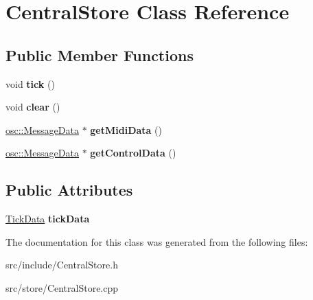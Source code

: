 \hypertarget{classCentralStore}{\section{Central\-Store Class Reference}
\label{classCentralStore}
}
\subsection*{Public Member Functions}
\begin{DoxyCompactItemize}
\item 
\hypertarget{classCentralStore_ab809e0f4e90d4d8d1873a89f3da889b3}{void {\bfseries tick} ()}\label{classCentralStore_ab809e0f4e90d4d8d1873a89f3da889b3}

\item 
\hypertarget{classCentralStore_a100ae6ad2506d4962d23966e23a1c78e}{void {\bfseries clear} ()}\label{classCentralStore_a100ae6ad2506d4962d23966e23a1c78e}

\item 
\hypertarget{classCentralStore_a910470f5eec98b92b82a4cb2f1c5f386}{\hyperlink{classosc_1_1MessageData}{osc\-::\-Message\-Data} $\ast$ {\bfseries get\-Midi\-Data} ()}\label{classCentralStore_a910470f5eec98b92b82a4cb2f1c5f386}

\item 
\hypertarget{classCentralStore_a3faaea58a012d25efaa710fa3d1942b7}{\hyperlink{classosc_1_1MessageData}{osc\-::\-Message\-Data} $\ast$ {\bfseries get\-Control\-Data} ()}\label{classCentralStore_a3faaea58a012d25efaa710fa3d1942b7}

\end{DoxyCompactItemize}
\subsection*{Public Attributes}
\begin{DoxyCompactItemize}
\item 
\hypertarget{classCentralStore_a6f0c4050f0983924bbad8c631746f8b7}{\hyperlink{structTickData}{Tick\-Data} {\bfseries tick\-Data}}\label{classCentralStore_a6f0c4050f0983924bbad8c631746f8b7}

\end{DoxyCompactItemize}


The documentation for this class was generated from the following files\-:\begin{DoxyCompactItemize}
\item 
src/include/Central\-Store.\-h\item 
src/store/Central\-Store.\-cpp\end{DoxyCompactItemize}
